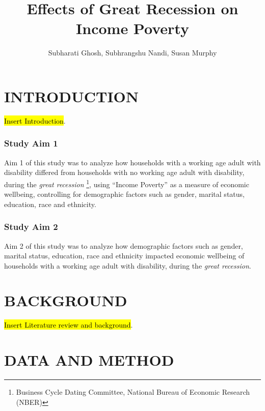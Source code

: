 \documentclass[11pt]{extarticle} %
\begin{document}
\doublespacing


\title{Effects of Great Recession on Income Poverty}
\author{Subharati Ghosh, Subhrangshu Nandi, Susan Murphy \\
\date{}
}

\maketitle
\section*{INTRODUCTION}
\noindent
{\hl{Insert Introduction}}.

\subsubsection*{Study Aim 1}
Aim 1 of this study was to analyze how households with a working age adult with disability differed from households with no working age adult with disability, during the {\emph{great recession}} \footnote{Business Cycle Dating Committee, National Bureau of Economic Research (NBER)}, using ``Income Poverty'' as a measure of economic wellbeing, controlling for demographic factors such as gender, marital status, education, race and ethnicity. 

\subsubsection*{Study Aim 2}
Aim 2 of this study was to analyze how demographic factors such as gender, marital status, education, race and ethnicity impacted economic wellbeing of households with a working age adult with disability, during the {\emph{great recession}}. 

\section*{BACKGROUND}
\noindent
{\hl{Insert Literature review and background}}.

\section*{DATA AND METHOD}
\end{document}
